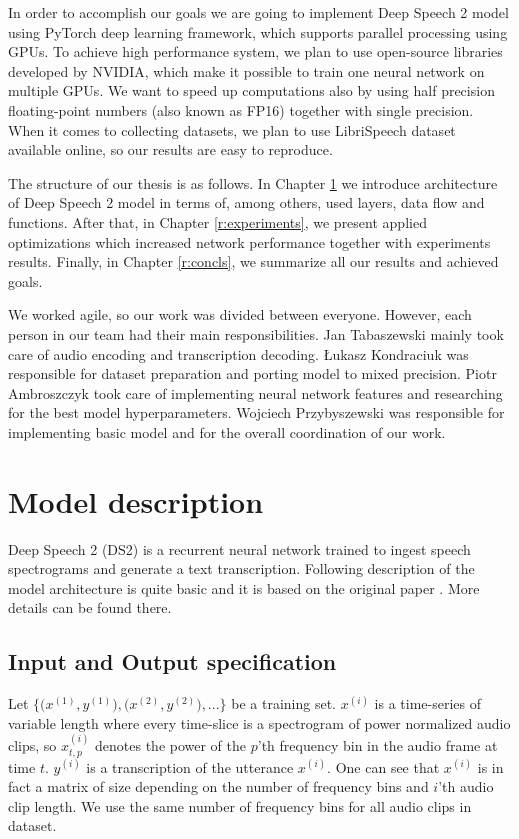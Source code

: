 \documentclass[licencjacka,en]{pracamgr}
\begin{document}
	In order to accomplish our goals we are going to implement Deep Speech 2 model using PyTorch deep learning framework, which supports parallel processing using GPUs. To achieve high performance system, we plan to use open-source libraries developed by NVIDIA, which make it possible to train one neural network on multiple GPUs. We want to speed up computations also by using half precision floating-point numbers (also known as FP16) together with single precision. When it comes to collecting datasets, we plan to use LibriSpeech \cite{LIBRI} dataset available online, so our results are easy to reproduce.
	
	The structure of our thesis is as follows. In Chapter \ref{r:desc} we introduce architecture of Deep Speech 2 model in terms of, among others, used layers, data flow and functions. After that, in Chapter \ref{r:experiments}, we present applied optimizations which increased network performance together with experiments results. Finally, in Chapter \ref{r:concls}, we summarize all our results and achieved goals.
	
	We worked agile, so our work was divided between everyone. However, each person in our team had their main responsibilities. Jan Tabaszewski mainly took care of audio encoding and transcription decoding. Łukasz Kondraciuk was responsible for dataset preparation and porting model to mixed precision. Piotr Ambroszczyk took care of implementing neural network features and researching for the best model hyperparameters. Wojciech Przybyszewski was responsible for implementing basic model and for the overall coordination of our work.
	
	\chapter{Model description}\label{r:desc}
	
	Deep Speech 2 (DS2) is a recurrent neural network trained to ingest speech spectrograms and generate a text transcription.
	Following description of the model architecture is quite basic and it is based on the original paper \cite{DS2}. More details can be found there.
	
	\section{Input and Output specification} \label{sec:input}
	Let $\big\{\big(x^{(1)}, y^{(1)}\big), \big(x^{(2)}, y^{(2)}\big), ...\big\}$ be a training set. $x^{(i)}$ is a time-series of variable length where every time-slice is a spectrogram of power
	normalized audio clips, so $x^{(i)}_{t,p}$ denotes the power of the $p$’th frequency bin in the audio frame at time $t$. $y^{(i)}$ is a transcription of the utterance $x^{(i)}$. One can see that $x^{(i)}$ is in fact a matrix of size depending on the number of frequency bins and $i$'th audio clip length. We use the same number of frequency bins for all audio clips in dataset.
	
\end{document}
